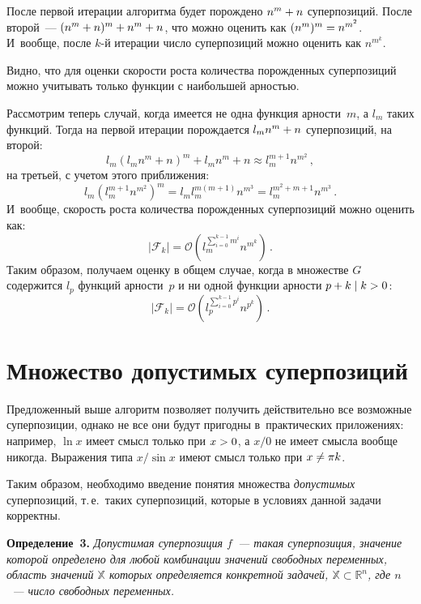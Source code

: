 \begin{multicols}{2}
  После первой итерации алгоритма будет по\-рож\-де\-но $n^m \hm+ n$ суперпозиций.
  После второй~--- $(n^m + n)^m \hm+ n^m + n$, что можно оценить как\linebreak
  $(n^m)^m \hm= n^{m^2}$. И~вообще, после $k$-й итерации чис\-ло
  суперпозиций можно оценить как $n^{m^k}$.

  Видно, что для оценки скорости роста количества порожденных суперпозиций
  можно учитывать только функции с наибольшей арностью.

  Рассмотрим теперь случай, когда имеется не одна функция арности~$m$, а
  $l_m$ таких функций. Тогда на первой итерации порождается $l_m n^m \hm+ n$
  суперпозиций, на второй:
  $$
  l_m (l_m n^m + n)^m + l_m n^m + n \approx l_m^{m+1} n^{m^2}\,,
$$
  на третьей, с учетом этого приближения:
  $$
  l_m (l_m^{m+1} n^{m^2})^m = l_m l_m^{m(m+1)} n^{m^3} = l_m^{m^2 + m + 1} n^{m^3}\,.
$$
  И~вообще, скорость роста количества порожденных суперпозиций можно оценить
  как:
  $$
  \left\vert \mathcal{F}_k \right\vert = \mathcal{O} 
  \left(l_m^{\sum_{i=0}^{k-1} m^i} n^{m^k}\right)\,.
  $$
  Таким образом, получаем оценку в общем случае, когда в множестве $G$ содержится
  $l_p$ функций ар\-ности~$p$ и ни одной функции ар\-ности $p \hm+ k \mid k\hm > 0$:
  $$
\left\vert \mathcal{F}_k \right\vert = \mathcal{O} 
\left(l_p^{\sum_{i=0}^{k-1} p^i} n^{p^k}\right)\,.
  $$



\section{Множество допустимых суперпозиций}

Предложенный выше алгоритм позволяет получить действительно все возможные
суперпозиции, однако не все они будут пригодны в~практических приложениях:
например, $\ln x$ имеет смысл только при $x \hm> 0$, а ${x}/{0}$ не имеет
смысла вообще никогда. Выражения типа ${x}/{\sin x}$ имеют смысл только
при $x \hm\neq \pi k$.

Таким образом, необходимо введение понятия множества \textit{допустимых}
суперпозиций, т.\,е.\ таких суперпозиций, которые в условиях данной
задачи корректны.

\smallskip

\noindent
\textbf{Определение~3.}
\textit{Допустимая суперпозиция $f$~--- такая суперпозиция, значение которой
  определено для любой комбинации значений свободных переменных, область
  значений $\mathbb{X}$ которых определяется конкретной задачей,
  $\mathbb{X} \subset \mathbb{R}^n$, где $n$~--- число свободных переменных.}



\end{multicols}

